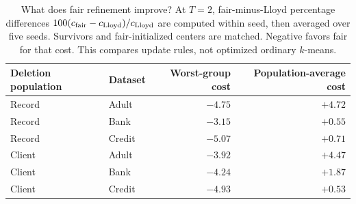 \begin{table}[htbp]
\centering
\caption{What does fair refinement improve? At $T=2$, fair-minus-Lloyd percentage differences $100(c_{\rm fair}-c_{\rm Lloyd})/c_{\rm Lloyd}$ are computed within seed, then averaged over five seeds. Survivors and fair-initialized centers are matched. Negative favors fair for that cost. This compares update rules, not optimized ordinary $k$-means.}
\label{tab:lloyd-main}
\begin{tabular}{llrr}
\toprule
Deletion population & Dataset & Worst-group cost & Population-average cost\\
\midrule
Record & Adult & $-4.75$ & $+4.72$ \\
Record & Bank & $-3.15$ & $+0.55$ \\
Record & Credit & $-5.07$ & $+0.71$ \\
Client & Adult & $-3.92$ & $+4.47$ \\
Client & Bank & $-4.24$ & $+1.87$ \\
Client & Credit & $-4.93$ & $+0.53$ \\
\bottomrule
\end{tabular}
\end{table}
